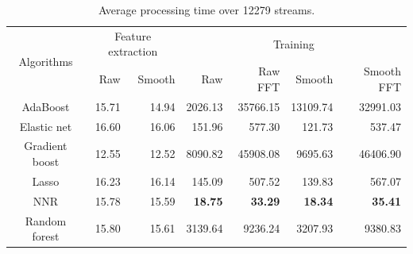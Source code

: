 \begin{table}[htpb]
   \centering
   \caption{Average processing time over 12279 streams.}
   \label{tab:timing}
   \begin{tabular}{|c|r|r|r|r|r|r|}
      \hline
      \multirow{2}{*}{Algorithms} & \multicolumn{2}{c|}{Feature extraction} &
      \multicolumn{4}{c|}{Training} \\ \cline{2-7}
                       & Raw   & Smooth & Raw            & Raw FFT        & Smooth         & Smooth FFT \\ \hline
      AdaBoost         & 15.71 & 14.94  & 2026.13        & 35766.15       & 13109.74       & 32991.03\\
      Elastic net      & 16.60 & 16.06  & 151.96         & 577.30         & 121.73         & 537.47\\
      Gradient boost   & 12.55 & 12.52  & 8090.82        & 45908.08       & 9695.63        & 46406.90\\
      Lasso            & 16.23 & 16.14  & 145.09         & 507.52         & 139.83         & 567.07\\
      NNR              & 15.78 & 15.59  & \textbf{18.75} & \textbf{33.29} & \textbf{18.34} & \textbf{35.41}\\
      Random forest    & 15.80 & 15.61  & 3139.64        & 9236.24        & 3207.93        & 9380.83\\
      \hline
   \end{tabular}
\end{table}

